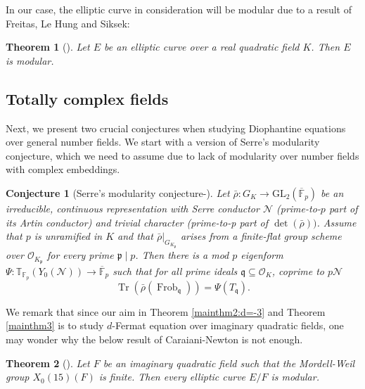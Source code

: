 \documentclass[]{article}
\newtheorem{theorem}{Theorem}
\newtheorem{conjecture}{Conjecture}
\begin{document}
In our case, the elliptic curve in consideration will be modular due to a result of Freitas, Le Hung and Siksek:

\begin{theorem}[{\cite[Theorem 1]{freitas2015elliptic}}]\label{box}
Let $E$ be an elliptic curve over a real quadratic field $K$. Then $E$ is modular.
\end{theorem}

\subsection{Totally complex fields}

Next, we present two crucial conjectures when studying Diophantine equations over general number fields. We start with a version of Serre's modularity conjecture, which we need to assume due to lack of modularity over number fields with complex embeddings.

\begin{conjecture}[Serre's modularity conjecture-{\cite[Conjecture 3.1]{csengun2018asymptotic}}]\label{serrconj}
Let $\bar{\rho}: G_K \rightarrow \mathrm{GL}_2\left(\overline{\mathbb{F}}_p\right)$ be an irreducible, continuous representation with Serre conductor $\mathcal{N}$ (prime-to-$p$ part of its Artin conductor) and trivial character (prime-to-p part of $\operatorname{det}(\bar{\rho}))$. Assume that $p$ is unramified in $K$ and that $\left.\bar{\rho}\right|_{G_{K_{\mathfrak{p}}}}$ arises from a finite-flat group scheme over $\mathcal{O}_{K_{\mathfrak{p}}}$ for every prime $\mathfrak{p} \mid p$. Then there is a mod $p$ eigenform $\Psi: \mathbb{T}_{\mathbb{F}_p}\left(Y_0(\mathcal{N})\right) \rightarrow \overline{\mathbb{F}}_p$ such that for all prime ideals $\mathfrak{q} \subseteq \mathcal{O}_K$, coprime to $p \mathcal{N}$
$$
\operatorname{Tr}\left(\bar{\rho}\left(\operatorname{Frob}_{\mathfrak{q}}\right)\right)=\Psi\left(T_{\mathfrak{q}}\right) .
$$
\end{conjecture}

We remark that since our aim in Theorem \ref{mainthm2:d=-3} and Theorem \ref{mainthm3} is to study $d$-Fermat equation over imaginary quadratic fields, one may wonder why the below result of Caraiani-Newton is not enough.

\begin{theorem}[{\cite[Theorem 1.1]{caraiani2023modularity}}]\label{modularity-imaginaryquadratic}
Let $F$ be an imaginary quadratic field such that the Mordell-Weil group $X_0(15)(F)$ is finite. Then every elliptic curve $E / F$ is modular.
\end{theorem}
\end{document}
